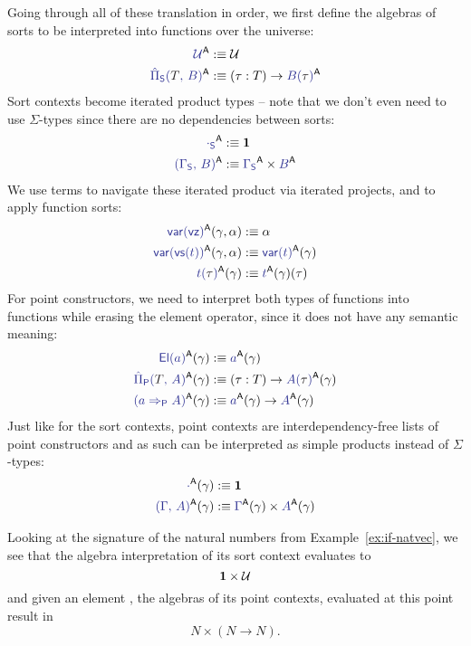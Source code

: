 \begin{defn}
Going through all of these translation in order, we first define the algebras
of sorts to be interpreted into functions over the universe:
\begin{align*}
\tqm{\UU}^\CC				&:\equiv \UU \\
\tqm{\ExtPiS{T}{B}}^\CC			&:\equiv (\tau : T) \to \tqm{B(\bltau)}^\CC
\end{align*}
Sort contexts become iterated product types -- note that we don't even need to
use $\Sigma$-types since there are no dependencies between sorts:
\begin{align*}
\tqm{\cdot_\Sc}^\CC			&:\equiv \unit \\
\tqm{(\Gamma_\Sc,\, B)}^\CC		&:\equiv \tqm{\Gamma_\Sc}^\CC \times \tqm{B}^\CC
\end{align*}
We use terms to navigate these iterated product via iterated projects, and to
apply function sorts:
\begin{align*}
\tqm{\var(\vz)}^\CC(\gamma, \alpha)	&:\equiv \alpha \\
\tqm{\var(\vs(t))}^\CC(\gamma, \alpha)	&:\equiv \tqm{\var(t)}^\CC(\gamma) \\
\tqm{t(\bltau)}^\CC(\gamma)		&:\equiv \tqm{t}^\CC(\gamma)(\bltau)
\end{align*}
For point constructors, we need to interpret both types of functions into functions
while erasing the element operator, since it does not have any semantic meaning:
\begin{align*}
\tqm{\El(a)}^\CC(\gamma)		&:\equiv \tqm{a}^\CC(\gamma) \\
\tqm{\ExtPiP{T}{A}}^\CC(\gamma)		&:\equiv (\tau : T) \to \tqm{A(\bltau)}^\CC(\gamma) \\
\tqm{(a \Rightarrow_\Pc A)}^\CC(\gamma)	&:\equiv \tqm{a}^\CC(\gamma) \to \tqm{A}^\CC(\gamma)
\end{align*}
Just like for the sort contexts, point contexts are interdependency-free lists
of point constructors and as such can be interpreted as simple products instead
of $\Sigma$-types:
\begin{align*}
\tqm{\cdot}^\CC(\gamma)			&:\equiv \unit \\
\tqm{(\Gamma,\, A)}^\CC(\gamma)		&:\equiv \tqm{\Gamma}^\CC(\gamma) \times \tqm{A}^\CC(\gamma)
\end{align*}
\end{defn}

\begin{example}
Looking at the signature of the natural numbers from Example~\ref{ex:if-natvec},
we see that the algebra interpretation of its sort context evaluates to
\begin{equation*}
\mathbf{1} \times \mathcal{U}
\end{equation*}
and given an element , the algebras of its
point contexts, evaluated at this point result in
\begin{equation*}
N \times (N \to N) \text{.}
\end{equation*}
\end{example}

